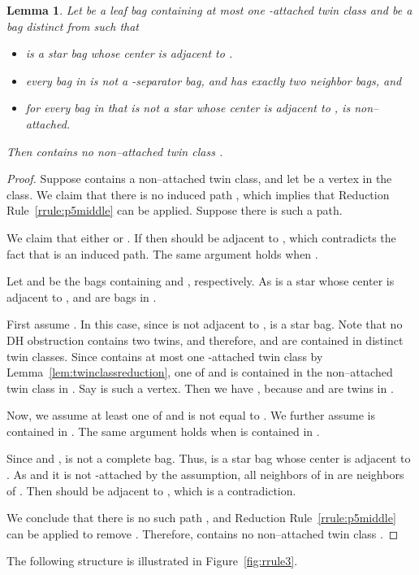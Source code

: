 \documentclass[11pt]{elsarticle}
\newtheorem{lemma}[theorem]{Lemma}
\begin{document}
\begin{lemma}
  \label{lem:starcenter}
Let  be a leaf bag containing at most  one -attached twin class and  be a bag distinct from  such that
\begin{itemize}
\item  is a star bag whose center is adjacent to .
\item every bag in  is not a -separator bag, and has exactly two neighbor bags, and 
\item for every bag  in  that is not a star whose center is adjacent to , 
 is non--attached.
\end{itemize}
Then  contains no non--attached twin class .
\end{lemma}
\begin{proof}
Suppose  contains a non--attached twin class, and 
let  be a vertex in the class.
We claim that there is no induced path , which implies that Reduction Rule~\ref{rrule:p5middle} can be applied.
Suppose there is such a path.

We claim that either  or . If  then  should be adjacent to , which contradicts the fact that 
 is an induced path. The same argument holds when .

Let  and  be the bags containing  and , respectively. As  is a star whose center is adjacent to ,
 and  are bags in . 

First assume . In this case, since  is not adjacent to ,  is a star bag.
Note that no DH obstruction contains two twins, and therefore,  and  are contained in distinct twin classes.
Since  contains at most one -attached twin class by Lemma~\ref{lem:twinclassreduction}, 
one of  and  is contained in the non--attached twin class in .
Say  is such a vertex. Then we have , because  and  are twins in .

Now, we assume at least one of  and  is not equal to .
We further assume  is contained in . The same argument holds when  is contained in .

Since  and ,  is not a complete bag. 
Thus,  is a star bag whose center is adjacent to .
As  and it is not -attached by the assumption, all neighbors of  in  are neighbors of .
Then  should be adjacent to , which is a contradiction.



We conclude that there is no such path , and Reduction Rule~\ref{rrule:p5middle} can be applied to remove . Therefore,  contains no non--attached twin class .
\end{proof}


The following structure is illustrated in Figure~\ref{fig:rrule3}.
 
\end{document}
